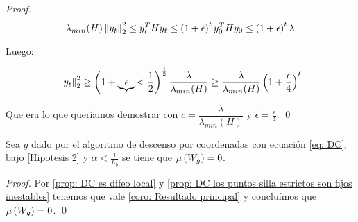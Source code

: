 \begin{proof}
	\begin{equation*}
		\lambda_{min}(H) \left\lVert y_t\right\rVert_2^2 \leq y_{t}^THy_{t} \leq \left(1+ \epsilon\right)^t y_{0}^THy_{0} \leq \left(1+ \epsilon\right)^t\lambda
	\end{equation*}

	Luego:
	
	\begin{equation*}
		\left\lVert y_t\right\rVert_2^2 \geq \left(1+ \underbrace{\epsilon}{< \frac{1}{2}}\right)^{\frac{t}{2}}{\dfrac{\lambda}{\lambda_{min}(H)}} \geq {\dfrac{\lambda}{\lambda_{min}(H)}}\left(1 + \frac{\epsilon}{4}\right)^t
	\end{equation*}
	
	Que era lo que quer\'iamos demostrar con $c = \dfrac{\lambda}{\lambda_{min}(H)}$ y $\tilde{\epsilon} = \frac{\epsilon}{4}$. \qed

\end{proof}

\begin{corollary}
	\label{coro: DC converge a minimos}
	Sea $g$ dado por el algoritmo de descenso por coordenadas con ecuaci\'on \ref{eq: DC}, bajo \ref{Hipotesis 2} y $\alpha < \frac{1}{L_b}$ se tiene que $\mu\left(W_g\right) = 0$.
\end{corollary}

\begin{proof}
	Por \ref{prop: DC es difeo local} y \ref{prop: DC los puntos silla estrictos son fijos inestables} tenemos que vale \ref{coro: Resultado principal} y conclu\'imos que $\mu \left(W_g\right) = 0$. \qed
\end{proof}

